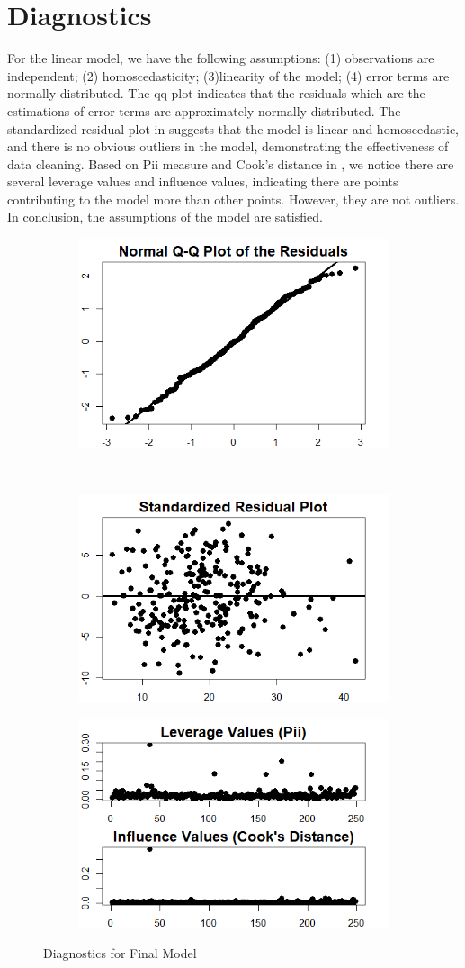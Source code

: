 \documentclass[12pt, letterpaper]{article}
\begin{document}
\section{Diagnostics}
\label{sec:diag}
For the linear model, we have the following assumptions: (1) observations are independent; (2) homoscedasticity; (3)linearity of the model; (4) error terms are normally distributed. The qq plot  indicates that the residuals which are the estimations of error terms are approximately normally distributed. The standardized residual plot in  suggests that the model is linear and homoscedastic, and there is no obvious outliers in the model, demonstrating the effectiveness of data cleaning. Based on Pii measure and Cook's distance in , we notice there are several leverage values and influence values, indicating there are points contributing to the model more than other points. However, they are not outliers. In conclusion, the assumptions of the model are satisfied. 
\begin{figure}
	\centering
	\label{fig:2}
	\begin{subfigure}
		\centering
		\includegraphics[width=.4\linewidth]{../Image/qq_plot.png}
	\end{subfigure}%
~
	\begin{subfigure}
		\centering
		\includegraphics[width=.4\linewidth]{../Image/Final_Model_Residual_Plot.png}
	\end{subfigure}
	\begin{subfigure}
	\centering
	\includegraphics[width=.5\linewidth]{../Image/Pii_Cook's_Distance.png}
\end{subfigure}
	\caption{Diagnostics for Final Model}
\end{figure}
\end{document}
